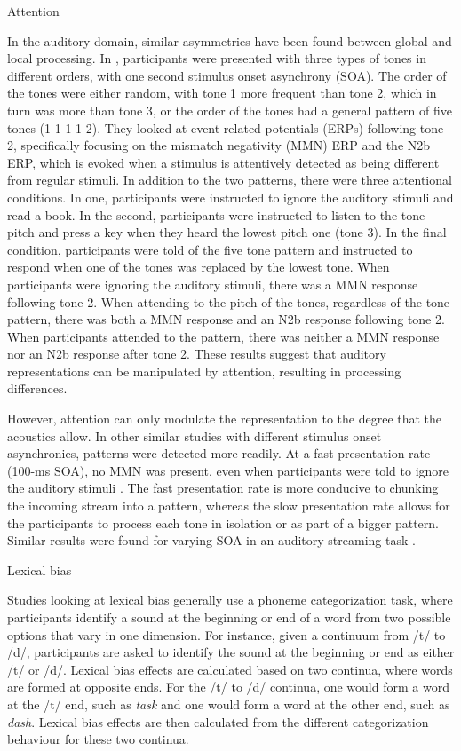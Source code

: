 Attention


In the auditory domain, similar asymmetries have been found between global and local processing.
In \citet{Sussman2002}, participants were presented with three types of tones in different orders, with one second stimulus onset asynchrony (SOA).  
The order of the tones were either random, with tone 1 more frequent than tone 2, which in turn was more than tone 3, or the order of the tones had a general pattern of five tones (1 1 1 1 2).  
They looked at event-related potentials (ERPs) following tone 2, specifically focusing on the mismatch negativity (MMN) ERP and the N2b ERP, which is evoked when a stimulus is attentively detected as being different from regular stimuli.
In addition to the two patterns, there were three attentional conditions.  
In one, participants were instructed to ignore the auditory stimuli and read a book.  
In the second, participants were instructed to listen to the tone pitch and press a key when they heard the lowest pitch one (tone 3). 
 In the final condition, participants were told of the five tone pattern and instructed to respond when one of the tones was replaced by the lowest tone.
When participants were ignoring the auditory stimuli, there was a MMN response following tone 2.  
When attending to the pitch of the tones, regardless of the tone pattern, there was both a MMN response and an N2b response following tone 2.  
When participants attended to the pattern, there was neither a MMN response nor an N2b response after tone 2.
These results suggest that auditory representations can be manipulated by attention, resulting in processing differences.

However, attention can only modulate the representation to the degree that the acoustics allow.
In other similar studies with different stimulus onset asynchronies, patterns were detected more readily.
At a fast presentation rate (100-ms SOA), no MMN was present, even when participants were told to ignore the auditory stimuli \citep{Sussman1998}.
The fast presentation rate is more conducive to chunking the incoming stream into a pattern, whereas the slow presentation rate allows for the participants to process each tone in isolation or as part of a bigger pattern.
Similar results were found for varying SOA in an auditory streaming task \citep{Sussman1998,Sussman1998a}.

Lexical bias


Studies looking at lexical bias generally use a phoneme categorization task, where participants identify a sound at the beginning or end of a word from two possible options that vary in one dimension.  
For instance, given a continuum from /t/ to /d/, participants are asked to identify the sound at the beginning or end as either /t/ or /d/. 
Lexical bias effects are calculated based on two continua, where words are formed at opposite ends. 
For the /t/ to /d/ continua, one would form a word at the /t/ end, such as \emph{task} and one would form a word at the other end, such as \emph{dash}.  
Lexical bias effects are then calculated from the different categorization behaviour for these two continua.

